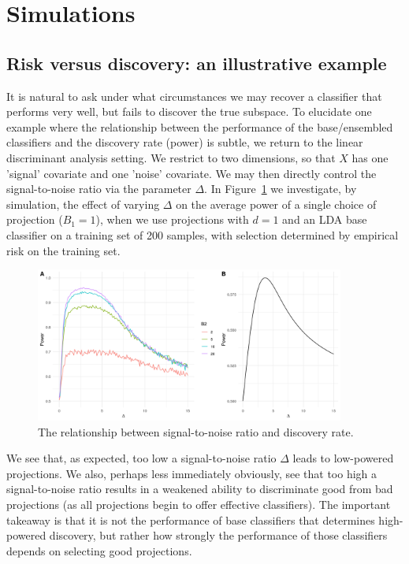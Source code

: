\documentclass[12pt]{article}
\begin{document}
\section{Simulations}
\subsection{Risk versus discovery: an illustrative example}
It is natural to ask under what circumstances we may recover a classifier that performs very well, but fails to discover the true subspace. To elucidate one example where the relationship between the performance of the base/ensembled classifiers and the discovery rate (power) is subtle, we return to the linear discriminant analysis setting. We restrict to two dimensions, so that $X$ has one 'signal' covariate and one 'noise' covariate. We may then directly control the signal-to-noise ratio via the parameter $\Delta$. In Figure~\ref{fig:ChangingDelta} we investigate, by simulation, the effect of varying $\Delta$ on the average power of a single choice of projection ($B_1 = 1$), when we use projections with $d=1$ and an LDA base classifier on a training set of 200 samples, with selection determined by empirical risk on the training set. 

\begin{figure}[htbp]
    \centering
    \includegraphics[width=4in]{../results/figures/ChangingDelta.png}
    \caption{The relationship between signal-to-noise ratio and discovery rate.\label{fig:ChangingDelta}}
\end{figure}

We see that, as expected, too low a signal-to-noise ratio $\Delta$ leads to low-powered projections. We also, perhaps less immediately obviously, see that too high a signal-to-noise ratio results in a weakened ability to discriminate good from bad projections (as all projections begin to offer effective classifiers). The important takeaway is that it is not the performance of base classifiers that determines high-powered discovery, but rather how strongly the performance of those classifiers depends on selecting good projections. 
\end{document}
